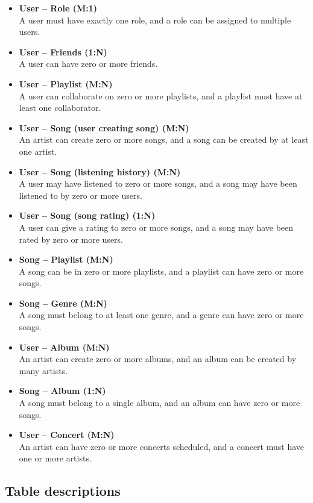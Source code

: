 \documentclass[11pt, a4paper]{article}
\begin{document}
\begin{itemize}
    \item \textbf{User -- Role (M:1)} \\
    A user must have exactly one role, and a role can be assigned to multiple users.
    \item \textbf{User -- Friends (1:N)} \\ 
    A user can have zero or more friends.
    \item \textbf{User -- Playlist (M:N)} \\
    A user can collaborate on zero or more playlists, and a playlist must have at least one collaborator.
    \item \textbf{User -- Song (user creating song) (M:N)} \\
    An artist can create zero or more songs, and a song can be created by at least one artist.
    \item \textbf{User -- Song (listening history) (M:N)} \\
    A user may have listened to zero or more songs, and a song may have been listened to by zero or more users.
    \item \textbf{User -- Song (song rating) (1:N)} \\
    A user can give a rating to zero or more songs, and a song may have been rated by zero or more users.
    \item \textbf{Song -- Playlist (M:N)} \\
    A song can be in zero or more playlists, and a playlist can have zero or more songs.
    \item \textbf{Song -- Genre (M:N)} \\
    A song must belong to at least one genre, and a genre can have zero or more songs.
    \item \textbf{User -- Album (M:N)} \\
    An artist can create zero or more albums, and an album can be created by many artists.
    \item \textbf{Song -- Album (1:N)} \\
    A song must belong to a single album, and an album can have zero or more songs.
    \item \textbf{User -- Concert (M:N)} \\
    An artist can have zero or more concerts scheduled, and a concert must have one or more artists.
\end{itemize}

\subsection{Table descriptions}
\end{document}
